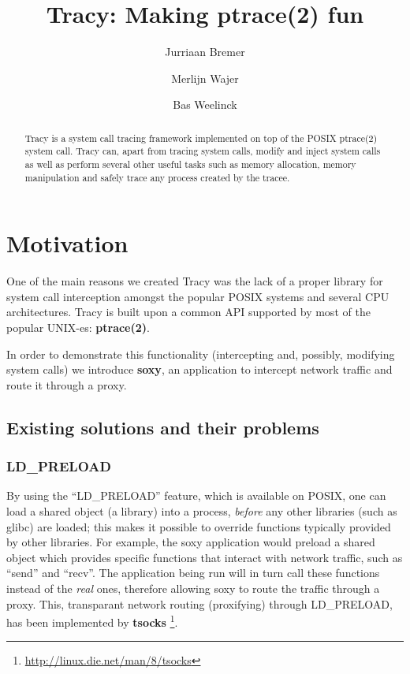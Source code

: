 \documentclass[a4paper, twoside, 10pt, twocolumn]{report}
\author{Jurriaan Bremer \and Merlijn Wajer \and Bas Weelinck}
\title{Tracy: Making ptrace(2) fun} %
\begin{document}
\maketitle

\begin{abstract}
    Tracy is a system call tracing framework implemented on top of the POSIX
    ptrace(2) system call.
    Tracy can, apart from tracing system calls, modify and inject system calls
    as well as perform several other useful tasks such as memory allocation,
    memory manipulation and safely trace any process created by the tracee.
\end{abstract}

\tableofcontents


%
\chapter{Motivation}

One of the main reasons we created Tracy was the lack of a proper library
for system call interception amongst the popular POSIX systems and several
CPU architectures. Tracy is built upon a common API supported by most of the
popular UNIX-es: \textbf{ptrace(2)}.

In order to demonstrate this functionality (intercepting and, possibly,
modifying system calls) we introduce \textbf{soxy}, an application to
intercept network traffic and route it through a proxy.

\section{Existing solutions and their problems}

\subsection{LD\_PRELOAD}

By using the ``LD\_PRELOAD'' feature, which is available on POSIX, one can
load a shared object (a library) into a process, \textit{before} any other
libraries (such as glibc) are loaded; this makes it possible to override
functions typically provided by other libraries. For example, the soxy
application would preload a shared object which provides specific functions
that interact with network traffic, such as ``send'' and ``recv''. The
application being run will in turn call these functions instead of the
\textit{real} ones, therefore allowing soxy to route the traffic through a
proxy. This, transparant network routing (proxifying) through LD\_PRELOAD,
has been implemented by \textbf{tsocks}
\footnote{\url{http://linux.die.net/man/8/tsocks}}.
\end{document}
